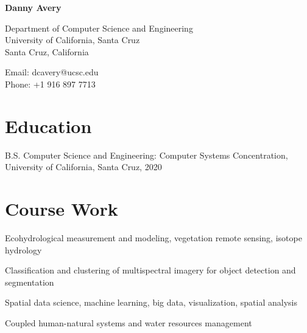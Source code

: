 \documentclass[12pt,letterpaper]{report}
\newcommand{\myname}{Danny Avery}
\newcommand{\namefont}[1]{{\normalfont\bfseries\Huge{#1}}}
\newcommand{\listitemspace}{0.15em}
\renewenvironment{itemize}
{\begin{list}{}{\setlength{\leftmargin}{0em}
			\setlength{\parskip}{0em}
			\setlength{\itemsep}{\listitemspace}
			\setlength{\parsep}{\listitemspace}}}
	{\end{list}}
\begin{document}
	\raggedright
	
	\namefont{\myname}
	
	\vspace{1em}
	\begin{minipage}[t]{0.495\textwidth}
		Department of Computer Science and Engineering \\
		University of California, Santa Cruz \\
		Santa Cruz, California
	\end{minipage}
	\begin{minipage}[t]{0.495\textwidth}
		Email: dcavery@ucsc.edu \\
		Phone: +1 916 897 7713
	\end{minipage}
	\vspace{0.5em}
	
	
	
	\section*{Education}
	
	\begin{tablist}
		
		\item[B.S.]  \tab Computer Science and Engineering: Computer Systems Concentration, University of California, Santa Cruz, 2020
		
	\end{tablist}	


	
	\section*{Course Work}
	
	\begin{itemize}
		
		\item Ecohydrological measurement and modeling, vegetation remote sensing, isotope hydrology
		
		\item Classification and clustering of multispectral imagery for object detection and segmentation
		
		\item Spatial data science, machine learning, big data, visualization, spatial analysis
		
		\item Coupled human-natural systems and water resources management 
		
	\end{itemize}
	
\end{document}
